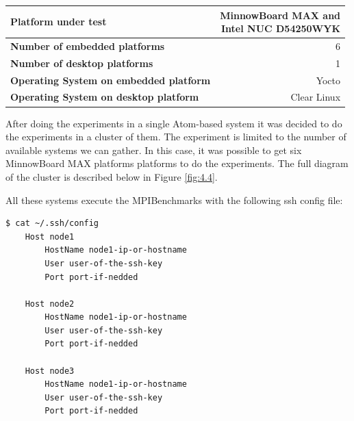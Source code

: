     \begin{center}
    \begin{tabular}{ | l | r |}
        \hline
        \textbf{Platform under test} & \shortstack{MinnowBoard MAX and \\  Intel  NUC D54250WYK } \\ \hline
        \textbf{Number of embedded platforms}  & 6  \\ \hline
        \textbf{Number of desktop platforms}  & 1  \\ \hline
        \textbf{Operating System on embedded platform} & Yocto  \\ \hline
        \textbf{Operating System on desktop platform} & Clear Linux  \\ \hline
    \end{tabular}
    \label{tab:mpi_perf_comp}
    \end{center}

After doing the experiments in a single Atom-based system it was  decided to do the
experiments in a cluster of them. The experiment is limited to the number of
available systems we can gather. In this case, it was possible to get six  MinnowBoard MAX
platforms \cite{minnowboard} platforms to do the experiments. The full diagram
of the cluster is described below in Figure \ref{fig:4.4}.

All these systems execute the MPIBenchmarks with the following ssh config file:

\begin{minipage}{\textwidth}
\end{minipage}

\begin{minipage}{\textwidth}

\begin{lstlisting}[frame=single]
  $ cat ~/.ssh/config
    Host node1
        HostName node1-ip-or-hostname
        User user-of-the-ssh-key
        Port port-if-nedded

    Host node2
        HostName node1-ip-or-hostname
        User user-of-the-ssh-key
        Port port-if-nedded

    Host node3
        HostName node1-ip-or-hostname
        User user-of-the-ssh-key
        Port port-if-nedded

\end{lstlisting}

\end{minipage}

